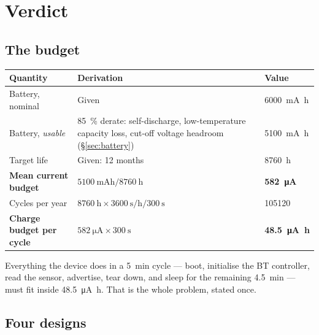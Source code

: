 \documentclass[11pt,a4paper]{article}
\begin{document}
\clearpage
\tableofcontents
\clearpage

\section{Verdict}
\label{sec:verdict}

\subsection{The budget}

\begin{center}
\begin{tabularx}{\textwidth}{lXl}
\toprule
\textbf{Quantity} & \textbf{Derivation} & \textbf{Value} \\
\midrule
Battery, nominal        & Given & \SI{6000}{\milli\ampere\hour} \\
Battery, \emph{usable}  & \SI{85}{\percent} derate: self-discharge, low-temperature capacity loss, cut-off voltage headroom (\S\ref{sec:battery}) & \SI{5100}{\milli\ampere\hour} \\
Target life             & Given: 12 months & \SI{8760}{\hour} \\
\midrule
\textbf{Mean current budget} & $\SI{5100}{\milli\ampere\hour} / \SI{8760}{\hour}$ & \textbf{\SI{582}{\micro\ampere}} \\
Cycles per year         & $\SI{8760}{\hour}\times\SI{3600}{\second\per\hour} / \SI{300}{\second}$ & \num{105120} \\
\textbf{Charge budget per cycle} & $\SI{582}{\micro\ampere}\times\SI{300}{\second}$ & \textbf{\SI{48.5}{\micro\ampere\hour}} \\
\bottomrule
\end{tabularx}
\end{center}

\noindent
Everything the device does in a \SI{5}{\minute} cycle --- boot, initialise the BT controller, read
the sensor, advertise, tear down, and sleep for the remaining \SI{4.5}{\minute} --- must fit inside
\SI{48.5}{\micro\ampere\hour}. That is the whole problem, stated once.

\subsection{Four designs}
\end{document}
